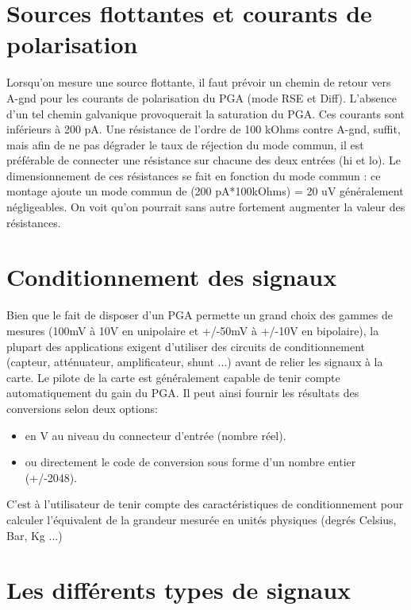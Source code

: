 \section{Sources flottantes et courants de polarisation}

Lorsqu'on mesure une source flottante, il faut prévoir un chemin de retour vers A-gnd pour les courants de polarisation du PGA (mode RSE et Diff). L'absence d'un tel chemin galvanique provoquerait la saturation du PGA. Ces courants sont inférieurs à 200 pA. Une résistance de l'ordre de 100 kOhms contre A-gnd, suffit, mais afin de ne pas dégrader le taux de réjection du mode commun, il est préférable de connecter une résistance sur chacune des deux entrées (hi et lo). Le dimensionnement de ces résistances se fait en fonction du mode commun : ce montage ajoute un mode commun de (200 pA*100kOhms) = 20 uV généralement négligeables. On voit qu'on pourrait sans autre fortement augmenter la valeur des résistances.

\section{Conditionnement des signaux}

Bien que le fait de disposer d'un PGA permette un grand choix des gammes de mesures (100mV à 10V en unipolaire et +/-50mV à +/-10V en bipolaire), la plupart des applications exigent d'utiliser des circuits de conditionnement  (capteur, atténuateur, amplificateur, shunt ...) avant de relier les signaux à la carte. Le pilote de la carte est généralement capable de tenir compte automatiquement du gain du PGA. Il peut ainsi fournir les résultats des conversions selon deux options:

\begin{itemize}
    \item en V au niveau du connecteur d'entrée (nombre réel).
    \item ou directement le code de conversion sous forme d'un nombre entier (+/-2048).
\end{itemize}

C'est à l'utilisateur de tenir compte des caractéristiques de conditionnement pour calculer l'équivalent de la grandeur mesurée en unités physiques (degrés Celsius, Bar, Kg ...)

\section{Les différents types de signaux}

